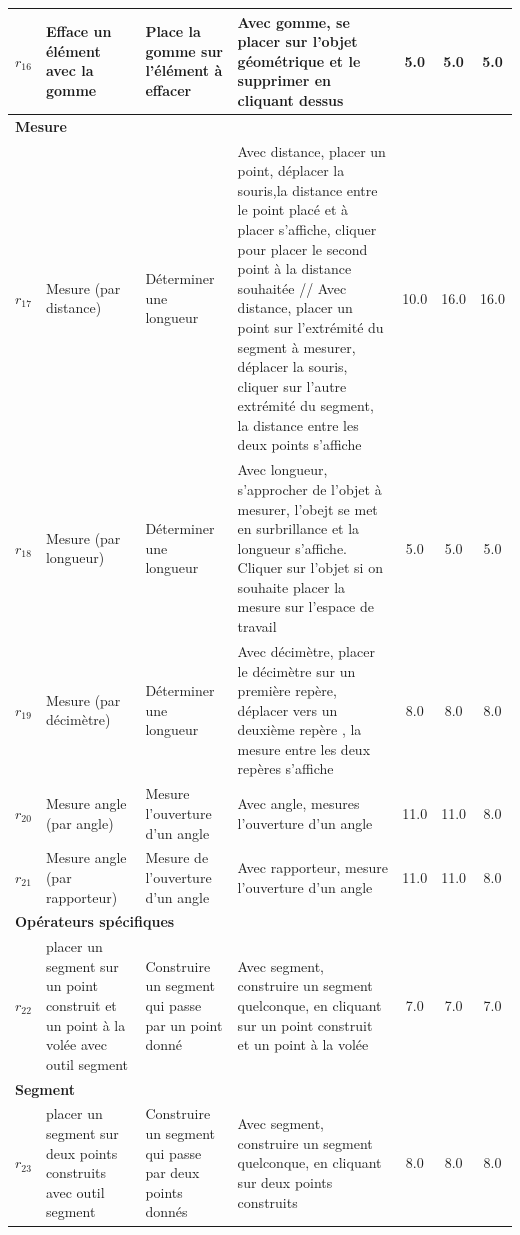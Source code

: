 \begin{longtable}{|c|p{3cm}|p{4cm}|p{4cm}|c|c|c|}
$r_{16}$\label{op_dlt_gom} & Efface un élément avec la gomme & Place la gomme sur l’élément à effacer & Avec gomme, se placer sur l'objet géométrique et le supprimer en cliquant dessus & 5.0 & 5.0 & 5.0 \\ \hline
\multicolumn{7}{|l|}{\textbf{Mesure}} \\ \hline
$r_{17}$\label{op_mes_dist} & Mesure (par distance) & Déterminer une longueur & Avec distance, placer un point, déplacer la souris,la distance entre le point placé et à placer s'affiche, cliquer pour placer le second point à la distance souhaitée // Avec distance, placer un point sur l'extrémité du segment à mesurer, déplacer la souris, cliquer sur l'autre extrémité du segment, la distance entre les deux points s'affiche & 10.0 & 16.0 & 16.0 \\ \hline
$r_{18}$\label{op_mes_long} & Mesure (par longueur) & Déterminer une longueur & Avec longueur, s'approcher de l'objet à mesurer, l'obejt se met en surbrillance et la longueur s'affiche. Cliquer sur l'objet si on souhaite placer la mesure sur l'espace de travail & 5.0 & 5.0 & 5.0 \\ \hline
$r_{19}$\label{op_mes_dec} & Mesure (par décimètre) & Déterminer une longueur & Avec décimètre, placer le décimètre sur un première repère, déplacer vers un deuxième repère , la mesure entre les deux repères s'affiche & 8.0 & 8.0 & 8.0 \\ \hline
$r_{20}$\label{op_mes_ang_ang} & Mesure angle (par angle) & Mesure l’ouverture d’un angle & Avec angle, mesures l’ouverture d’un angle & 11.0 & 11.0 & 8.0 \\ \hline
$r_{21}$\label{op_mes_ang_rap} & Mesure angle (par rapporteur) & Mesure de l’ouverture d’un angle & Avec rapporteur, mesure l’ouverture d’un angle & 11.0 & 11.0 & 8.0 \\ \hline
\multicolumn{7}{|l|}{\textbf{Opérateurs spécifiques}} \\ \hline
$r_{22}$\label{op_sgt-pt_const_pt_vol_out_seg} & placer un segment sur un point construit et un point à la volée avec outil segment & Construire un segment qui passe par un point donné & Avec segment, construire un segment quelconque, en cliquant sur un point construit et un point à la volée & 7.0 & 7.0 & 7.0 \\ \hline
\multicolumn{7}{|l|}{\textbf{Segment}} \\ \hline
$r_{23}$\label{op_sgt-pts_const_out_seg} & placer un segment sur deux points construits avec outil segment & Construire un segment qui passe par deux points donnés & Avec segment, construire un segment quelconque, en cliquant sur deux points construits & 8.0 & 8.0 & 8.0 \\ \hline

\end{longtable}
